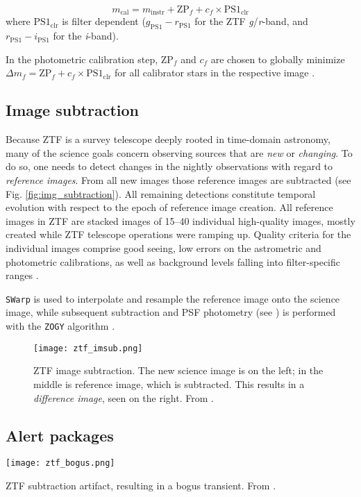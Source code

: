 \begin{equation}
m_\text{cal} = m_\text{instr} + \text{ZP}_f + c_f \times \text{PS1}_\text{clr}
\end{equation}
where $\text{PS1}_\text{clr}$ is filter dependent ($g_\text{PS1}-r_\text{PS1}$ for the ZTF \textit{g}/\textit{r}-band, and $r_\text{PS1}-i_\text{PS1}$ for the \textit{i}-band).

In the photometric calibration step, $\text{ZP}_f$ and $c_f$ are chosen to globally minimize $\Delta m_f = \text{ZP}_f + c_f \times \text{PS1}_\text{clr}$ for all calibrator stars in the respective image \cite{Masci2019a}.

\subsection{Image subtraction} \label{ztf_image_subtraction}
Because ZTF is a survey telescope deeply rooted in time-domain astronomy, many of the science goals concern observing sources that are \textit{new} or \textit{changing}. To do so, one needs to detect changes in the nightly observations with regard to \textit{reference images}. From all new images those reference images are subtracted (see Fig. \ref{fig:img_subtraction}). All remaining detections constitute temporal evolution with respect to the epoch of reference image creation. All reference images in ZTF are stacked images of 15--40 individual high-quality images, mostly created while ZTF telescope operations were ramping up. Quality criteria for the individual images comprise good seeing, low errors on the astrometric and photometric calibrations, as well as background levels falling into filter-specific ranges \cite{Masci2019}.

\texttt{SWarp}  is used to interpolate and resample the reference image onto the science image, while subsequent subtraction and PSF photometry (see ) is performed with the \texttt{ZOGY} algorithm .

\begin{figure}[h!]
    \texttt{[image: ztf\_imsub.png]}
    \caption[ZTF image subtraction]{ZTF image subtraction. The new science image is on the left; in the middle is reference image, which is subtracted. This results in a \textit{difference image}, seen on the right. From \cite{Mahabal2019}.}
\end{figure}

\subsection{Alert packages}
\begin{marginfigure}
    \texttt{[image: ztf\_bogus.png]}
    \caption[ZTF subtraction artifact]{ZTF subtraction artifact, resulting in a bogus transient. From \cite{Mahabal2019}.}
\end{marginfigure}

